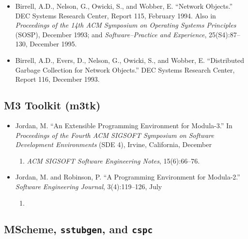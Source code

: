 \documentclass[
  12pt,
]{report}
\providecommand{\tightlist}{%
  \setlength{\itemsep}{0pt}\setlength{\parskip}{0pt}}
\begin{document}
\begin{itemize}
\item
  Birrell, A.D., Nelson, G., Owicki, S., and Wobber, E. ``Network
  Objects.'' DEC Systems Research Center, Report 115, February 1994.
  Also in \emph{Proceedings of the 14th ACM Symposium on Operating
  Systems Principles} (SOSP), December 1993; and
  \emph{Software--Practice and Experience}, 25(S4):87--130, December
  1995.
\item
  Birrell, A.D., Evers, D., Nelson, G., Owicki, S., and Wobber, E.
  ``Distributed Garbage Collection for Network Objects.'' DEC Systems
  Research Center, Report 116, December 1993.
\end{itemize}

\subsection{M3 Toolkit (m3tk)}\label{m3-toolkit-m3tk}

\begin{itemize}
\tightlist
\item
  Jordan, M. ``An Extensible Programming Environment for Modula-3.'' In
  \emph{Proceedings of the Fourth ACM SIGSOFT Symposium on Software
  Development Environments} (SDE 4), Irvine, California, December

  \begin{enumerate}
  \def\labelenumi{\arabic{enumi}.}
  \setcounter{enumi}{1989}
  \tightlist
  \item
    \emph{ACM SIGSOFT Software Engineering Notes}, 15(6):66--76.
  \end{enumerate}
\item
  Jordan, M. and Robinson, P. ``A Programming Environment for
  Modula-2.'' \emph{Software Engineering Journal}, 3(4):119--126, July

  \begin{enumerate}
  \def\labelenumi{\arabic{enumi}.}
  \setcounter{enumi}{1987}
  \tightlist
  \item
  \end{enumerate}
\end{itemize}

\subsection{\texorpdfstring{MScheme, \texttt{sstubgen}, and
\texttt{cspc}}{MScheme, sstubgen, and cspc}}\label{mscheme-sstubgen-and-cspc}
\end{document}
